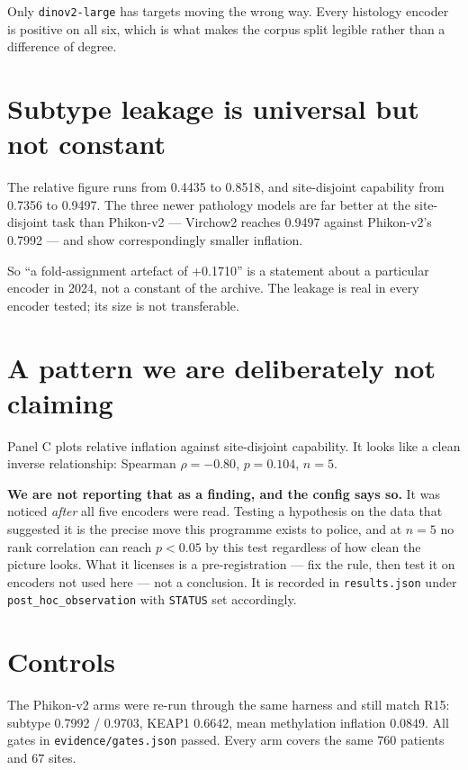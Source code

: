 \documentclass[11pt,a4paper]{article}
\begin{document}
\noindent Only \texttt{dinov2-large} has targets moving the wrong way. Every histology encoder is
positive on all six, which is what makes the corpus split legible rather than a difference of degree.

\section{Subtype leakage is universal but not constant}

The relative figure runs from 0.4435 to
0.8518, and site-disjoint capability from
0.7356 to
0.9497. The three newer pathology models are far
better at the site-disjoint task than Phikon-v2 --- Virchow2 reaches
0.9497 against Phikon-v2's
0.7992 --- and show correspondingly smaller inflation.

So ``a fold-assignment artefact of +0.1710'' is a statement about a
particular encoder in 2024, not a constant of the archive. The leakage is real in every encoder
tested; its size is not transferable.

\section{A pattern we are deliberately not claiming}

Panel C plots relative inflation against site-disjoint capability. It looks like a clean inverse
relationship: Spearman $\rho = -0.80$, $p = 0.104$,
$n = 5$.

\textbf{We are not reporting that as a finding, and the config says so.} It was noticed
\emph{after} all five encoders were read. Testing a hypothesis on the data that suggested it is
the precise move this programme exists to police, and at $n = 5$ no rank
correlation can reach $p<0.05$ by this test regardless of how clean the picture looks. What it
licenses is a pre-registration --- fix the rule, then test it on encoders not used here --- not a
conclusion. It is recorded in \texttt{results.json} under
\texttt{post\_hoc\_observation} with \texttt{STATUS} set accordingly.

\section{Controls}

The Phikon-v2 arms were re-run through the same harness and still match R15: subtype
0.7992 / 0.9703, KEAP1
0.6642, mean methylation inflation
0.0849. All gates in \texttt{evidence/gates.json} passed. Every
arm covers the same 760 patients and 67 sites.
\end{document}
